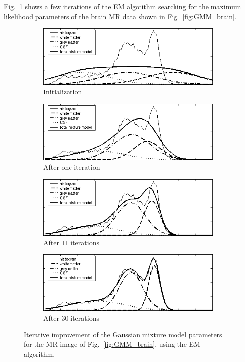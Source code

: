 \documentclass[10pt,twoside]{book}
\begin{document}
Fig.~\ref{fig:EMProgress} shows a few iterations of the EM algorithm searching for the maximum likelihood parameters of the brain MR data shown in Fig.~\ref{fig:GMM_brain}.

\begin{figure}
  \centering
  \begin{subfigure}{0.48\textwidth}
    \centering
    \includegraphics[width=\textwidth]{croppedFrame01}
    \caption{Initialization}
  \end{subfigure}
  \hfill
  \begin{subfigure}{0.48\textwidth}
    \centering
    \includegraphics[width=\textwidth]{croppedFrame02}
    \caption{After one iteration}
  \end{subfigure}
  \begin{subfigure}{0.48\textwidth}
    \centering
    \includegraphics[width=\textwidth]{croppedFrame11}
    \caption{After 11 iterations}
  \end{subfigure}
  \hfill
  \begin{subfigure}{0.48\textwidth}
    \centering
    \includegraphics[width=\textwidth]{croppedFrame30}
    \caption{After 30 iterations}
  \end{subfigure}
  \caption{Iterative improvement of the Gaussian mixture model parameters for the MR image of Fig.~\ref{fig:GMM_brain}, using the EM algorithm.}
  \label{fig:EMProgress}
\end{figure}
\end{document}
